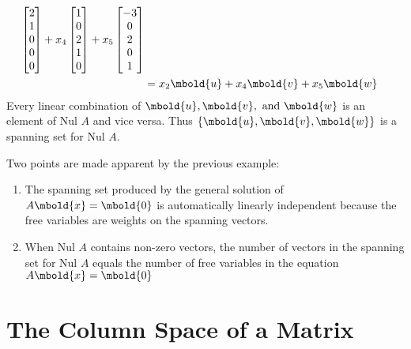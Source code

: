 \documentclass[12pt letter]{report}
\begin{document}
{{\begin{align*}
      \begin{bmatrix} 2 \\ 1 \\ 0 \\ 0 \\ 0 \end{bmatrix} + x_4 \begin{bmatrix} 1 \\ 0 \\ 2 \\ 1 \\ 0 \end{bmatrix} +
      x_5 \begin{bmatrix} -3 \\ 0 \\ 2\\ 0 \\ 1 \end{bmatrix} \\
       & = x_2 \mbold{u} + x_4 \mbold{v} + x_5 \mbold{w}      \\
    \end{align*}
    Every linear combination of $\mbold{u}, \mbold{v}, \text{ and } \mbold{w}$ is an element of $\text{Nul } A$ and vice
    versa. Thus $\{\mbold{u}, \mbold{v}, \mbold{w}\} $ is a spanning set for $\text{Nul } A$.
  }
}

Two points are made apparent by the previous example:
\begin{enumerate}
  \item The spanning set produced by the general solution of $A\mbold{x} = \mbold{0}$ is automatically linearly
        independent because the free variables are weights on the spanning vectors.
  \item When $\text{Nul }A$ contains non-zero vectors, the number of vectors in the spanning set for $\text{Nul } A$
        equals the number of free variables in the equation $A\mbold{x} = \mbold{0}$
\end{enumerate}

\section{The Column Space of a Matrix}

\end{document}
